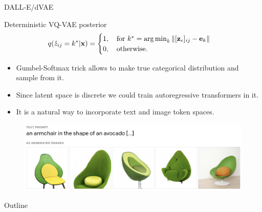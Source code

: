 \begin{frame}{DALL-E/dVAE}
	\begin{block}{Deterministic VQ-VAE posterior}
		\vspace{-0.3cm}
		\[
			q(\hat{z}_{ij} = k^* | \mathbf{x}) = \begin{cases}
				1 , \quad \text{for } k^* = \operatorname*{arg\,min}_k \| [\mathbf{z}_e]_{ij} - \mathbf{e}_k \| \\
				0, \quad \text{otherwise}.
			\end{cases}
		\]
		\vspace{-0.3cm}
	\end{block}
	\begin{itemize}
		\item Gumbel-Softmax trick allows to make true categorical distribution and sample from it.
		\item Since latent space is discrete we could train autoregressive transformers in it.
		\item It is a natural way to incorporate text and image token spaces.
	\end{itemize}
	\begin{figure}
		\includegraphics[width=\linewidth]{figs/dalle}
	\end{figure}
\end{frame}
\begin{frame}{Outline}
	\tableofcontents
\end{frame}
